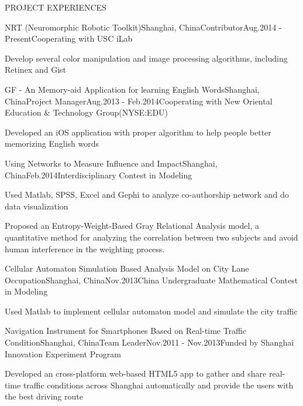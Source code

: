 \documentclass{resume} %
\begin{document}
\begin{rSection}{PROJECT EXPERIENCES}

  \begin{pSubsection}{NRT (Neuromorphic Robotic Toolkit)}{Shanghai, China}{Contributor}{Aug.2014 - Present}{Cooperating
    with USC iLab}
  \item Develop several color manipulation and image processing algorithms, including Retinex and Gist
  \end{pSubsection}

  \begin{pSubsection}{GF - An Memory-aid Application for learning English Words}{Shanghai,
    China}{Project Manager}{Aug.2013 - Feb.2014}{Cooperating with New Oriental Education \& Technology Group(NYSE:EDU) }
  \item Developed an iOS application with proper algorithm to help people better memorizing English words
  \end{pSubsection}

  \begin{pSubsection}{Using Networks to Measure Influence and Impact}{Shanghai,
  China}{}{Feb.2014}{Interdisciplinary Contest in Modeling}
  \item Used Matlab, SPSS, Excel and Gephi to analyze co-authorship network and do data visualization
  \item Proposed an Entropy-Weight-Based Gray Relational Analysis model, a quantitative method for
    analyzing the correlation between two subjects and avoid human interference in the
    weighting process.
  \end{pSubsection}

  \begin{pSubsection}{Cellular Automaton Simulation Based Analysis Model
  on City Lane Occupation}{Shanghai,
  China}{}{Nov.2013}{China Undergraduate Mathematical Contest in Modeling}
  \item Used Matlab to implement cellular automaton model and simulate the city traffic
  \end{pSubsection}

  \begin{pSubsection}{Navigation Instrument for Smartphones Based on Real-time Traffic Condition}{Shanghai,
    China}{Team Leader}{Nov.2011 - Nov.2013}{Funded by Shanghai Innovation Experiment Program}
  \item Developed an cross-platform web-based HTML5 app to gather and share real-time traffic conditions across
    Shanghai automatically and provide the users with the best driving route
  \end{pSubsection}


\end{rSection}
\end{document}

